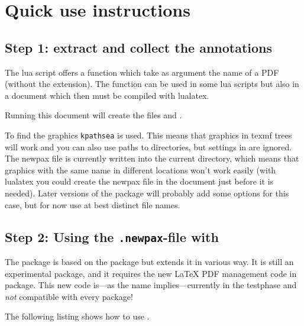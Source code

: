 \documentclass[DIV=12,parskip=half-,bibliography=totoc]{scrartcl}
\begin{document}
\section{Quick use instructions}

\subsection{Step 1: extract and collect the annotations}

The lua script offers a function which take as argument the name of a PDF (without the extension).
The function can be used in some lua scripts but also in a document which then must be compiled
with lualatex.



Running this document will create the files  and .

To find the graphics \texttt{kpathsea} is used. This means that graphics in texmf trees will work and
you can also use paths to directories, but settings in  are ignored. The newpax
file is currently written into the current directory, which means that graphics with the same name
in different locations won't work easily (with lualatex you could create the newpax file in the document
just before it is needed). Later versions of the package will probably add some options for this case,
but for now use at best distinct file names.


\subsection{Step 2: Using the \texttt{.newpax}-file with \texorpdfstring{}{newpax}}

The package  is based on the package  but extends it in various way.
It is still an experimental package, and it requires the new \LaTeX{} PDF management
code in  package. This new code is---as the name implies---currently in the testphase and \emph{not} compatible with every package!

The following listing shows how to use .
\end{document}
